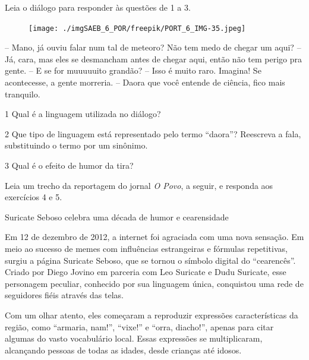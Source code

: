 Leia o diálogo para responder às questões de 1 a 3.

\begin{figure}
\texttt{[image: ./imgSAEB\_6\_POR/freepik/PORT\_6\_IMG-35.jpeg]}
\end{figure}

-- Mano, já ouviu falar num tal de meteoro? Não tem medo de chegar um
aqui? -- Já, cara, mas eles se desmancham antes de chegar aqui, então
não tem perigo pra gente. -- E se for muuuuuito grandão? -- Isso é muito
raro. Imagina! Se acontecesse, a gente morreria. -- Daora que você
entende de ciência, fico mais tranquilo.

\num{1} Qual é a linguagem utilizada no diálogo?



\num{2} Que tipo de linguagem está representado pelo termo ``daora''?
Reescreva a fala, substituindo o termo por um sinônimo.



\num{3} Qual é o efeito de humor da tira?



Leia um trecho da reportagem do jornal \emph{O Povo}, a seguir, e
responda aos exercícios 4 e 5.

Suricate Seboso celebra uma década de humor e cearensidade

Em 12 de dezembro de 2012, a internet foi agraciada com uma nova
sensação. Em meio ao sucesso de memes com influências estrangeiras e
fórmulas repetitivas, surgiu a página Suricate Seboso, que se tornou o
símbolo digital do ``cearencês''. Criado por Diego Jovino em parceria
com Leo Suricate e Dudu Suricate, esse personagem peculiar, conhecido
por sua linguagem única, conquistou uma rede de seguidores fiéis através
das telas.

Com um olhar atento, eles começaram a reproduzir expressões
características da região, como ``armaria, nam!'', ``vixe!'' e ``orra,
diacho!'', apenas para citar algumas do vasto vocabulário local. Essas
expressões se multiplicaram, alcançando pessoas de todas as idades,
desde crianças até idosos.

